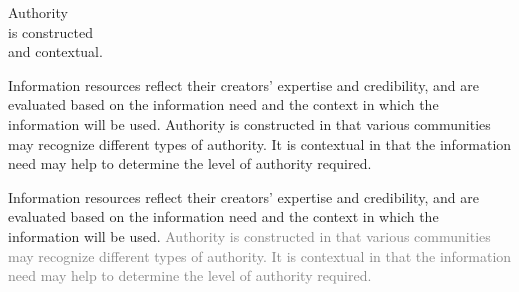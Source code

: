 \documentclass[17pt]{extarticle}
\begin{document}
{\Huge

\begin{center}

  Authority \\
  is constructed \\
  and contextual.

\end{center}

\newpage


\vspace*{1in}

{\LARGE

  \begin{center}

    Information resources reflect their creators’ expertise and credibility, and are evaluated based on the information need and the context in which the information will be used. Authority is constructed in that various communities may recognize different types of authority. It is contextual in that the information need may help to determine the level of authority required.

\end{center}

}

\newpage


\vspace*{1in}

{\LARGE

  \begin{center}

    Information resources reflect their creators’ expertise and credibility, and are evaluated based on the information need and the context in which the information will be used. \textcolor{gray}{Authority is constructed in that various communities may recognize different types of authority. It is contextual in that the information need may help to determine the level of authority required.}

\end{center}

}

\newpage


\vspace*{1in}

{\LARGE

  \begin{center}


\end{center}}}
\end{document}
